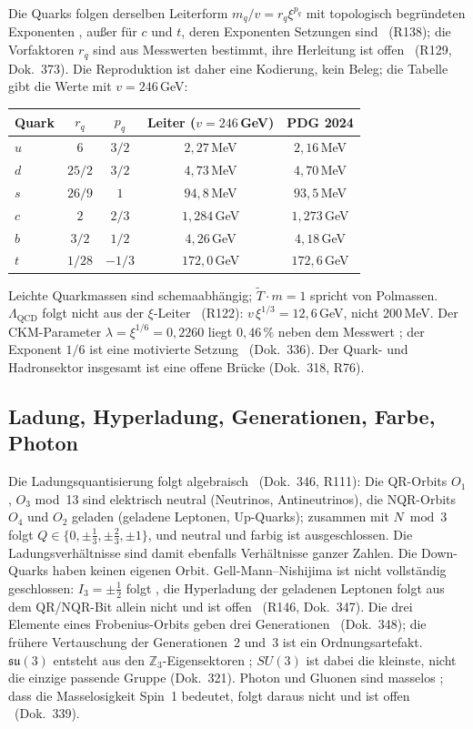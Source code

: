 Die Quarks folgen derselben Leiterform $m_q/v=r_q\xi^{p_q}$ mit topologisch begründeten
Exponenten \KM, außer für $c$ und $t$, deren Exponenten Setzungen sind \SM\ (R138); die
Vorfaktoren $r_q$ sind aus Messwerten bestimmt, ihre Herleitung ist offen \SM\ (R129, Dok.~373).
Die Reproduktion ist daher eine Kodierung, kein Beleg; die Tabelle gibt die Werte mit
$v=246$\,GeV:
\begin{center}
\small
\begin{tabular}{@{}lcccc@{}}
\toprule
\textbf{Quark} & $r_q$ & $p_q$ & \textbf{Leiter} ($v=246$\,GeV) & \textbf{PDG 2024} \\
\midrule
$u$ & $6$ & $3/2$ & $2{,}27$\,MeV & $2{,}16$\,MeV \\
$d$ & $25/2$ & $3/2$ & $4{,}73$\,MeV & $4{,}70$\,MeV \\
$s$ & $26/9$ & $1$ & $94{,}8$\,MeV & $93{,}5$\,MeV \\
$c$ & $2$ & $2/3$ & $1{,}284$\,GeV & $1{,}273$\,GeV \\
$b$ & $3/2$ & $1/2$ & $4{,}26$\,GeV & $4{,}18$\,GeV \\
$t$ & $1/28$ & $-1/3$ & $172{,}0$\,GeV & $172{,}6$\,GeV \\
\bottomrule
\end{tabular}
\end{center}
Leichte Quarkmassen sind schemaabhängig; $\tilde T\cdot m=1$ spricht von Polmassen.
$\Lambda_{\text{QCD}}$ folgt nicht aus der $\xi$-Leiter \XM\ (R122): $v\,\xi^{1/3}=12{,}6$\,GeV,
nicht 200\,MeV. Der CKM-Parameter $\lambda=\xi^{1/6}=0{,}2260$ liegt $0{,}46\,\%$ neben dem
Messwert \KM; der Exponent $1/6$ ist eine motivierte Setzung \SM\ (Dok.~336). Der Quark-
und Hadronsektor insgesamt ist eine offene Brücke (Dok.~318, R76).

\subsection{Ladung, Hyperladung, Generationen, Farbe, Photon}

Die Ladungsquantisierung folgt algebraisch \BM\ (Dok.~346, R111): Die QR-Orbits $O_1$, $O_3$
mod~13 sind elektrisch neutral (Neutrinos, Antineutrinos), die NQR-Orbits $O_4$ und $O_2$ geladen
(geladene Leptonen, Up-Quarks); zusammen mit $N\bmod3$ folgt
$Q\in\{0,\pm\tfrac13,\pm\tfrac23,\pm1\}$, und \glqq neutral und farbig\grqq{} ist ausgeschlossen.
Die Ladungsverhältnisse sind damit ebenfalls Verhältnisse ganzer Zahlen. Die Down-Quarks haben
keinen eigenen Orbit. Gell-Mann--Nishijima ist nicht vollständig geschlossen: $I_3=\pm\tfrac12$
folgt \BM, die Hyperladung der geladenen Leptonen folgt aus dem QR/NQR-Bit allein nicht und ist
offen \SM\ (R146, Dok.~347). Die drei Elemente eines Frobenius-Orbits geben drei Generationen
\BM\ (Dok.~348); die frühere Vertauschung der Generationen~2 und~3 ist ein Ordnungsartefakt.
$\mathfrak{su}(3)$ entsteht aus den $\mathbb Z_3$-Eigensektoren \BM; $SU(3)$ ist dabei die
kleinste, nicht die einzige passende Gruppe (Dok.~321). Photon und Gluonen sind masselos \BM;
dass die Masselosigkeit Spin~1 bedeutet, folgt daraus nicht und ist offen \SM\ (Dok.~339).

